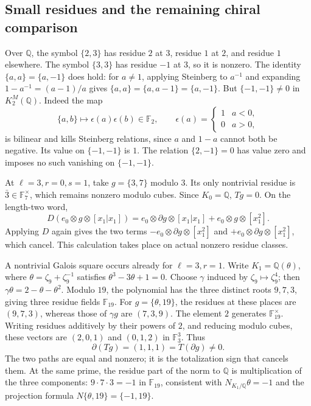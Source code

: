 \subsection{Small residues and the remaining chiral comparison}

Over \(\mathbb Q\), the symbol \(\{2,3\}\) has residue \(2\) at
\(3\), residue \(1\) at \(2\), and residue \(1\) elsewhere.
The symbol \(\{3,3\}\) has residue \(-1\) at \(3\), so it is
nonzero. The identity \(\{a,a\}=\{a,-1\}\) does hold: for
\(a\neq1\), applying Steinberg to \(a^{-1}\) and expanding
\(1-a^{-1}=(a-1)/a\) gives
\(\{a,a\}=\{a,a-1\}=\{a,-1\}\).
But \(\{-1,-1\}\neq0\) in \(K_2^M(\mathbb Q)\). Indeed the map
\[
 \{a,b\}\longmapsto\epsilon(a)\epsilon(b)\in\mathbb F_2,
 \qquad\epsilon(a)=\begin{cases}1&a<0,\\0&a>0,\end{cases}
\]
is bilinear and kills Steinberg relations, since \(a\) and \(1-a\)
cannot both be negative. Its value on \(\{-1,-1\}\) is \(1\).
The relation \(\{2,-1\}=0\) has value zero and imposes no such
vanishing on \(\{-1,-1\}\).

At \(\ell=3,r=0,s=1\), take \(g=\{3,7\}\) modulo \(3\).
Its only nontrivial residue is \(\bar3\in\mathbb F_7^\times\),
which remains nonzero modulo cubes. Since \(K_0=\mathbb Q\),
\(Tg=0\). On the length-two word,
\[
 D(e_0\otimes g\otimes[x_1|x_1])
 =e_0\otimes\partial g\otimes[x_1|x_1]
  +e_0\otimes g\otimes[x_1^2].
\]
Applying \(D\) again gives the two terms
\(-e_0\otimes\partial g\otimes[x_1^2]\) and
\(+e_0\otimes\partial g\otimes[x_1^2]\), which cancel.
This calculation takes place on actual nonzero residue classes.

A nontrivial Galois square occurs already for \(\ell=3,r=1\).
Write \(K_1=\mathbb Q(\theta)\), where
\(\theta=\zeta_9+\zeta_9^{-1}\) satisfies
\(\theta^3-3\theta+1=0\). Choose \(\gamma\) induced by
\(\zeta_9\mapsto\zeta_9^4\); then
\(\gamma\theta=2-\theta-\theta^2\).
Modulo \(19\), the polynomial has the three distinct roots
\(9,7,3\), giving three residue fields \(\mathbb F_{19}\).
For \(g=\{\theta,19\}\), the residues at these places are
\((9,7,3)\), whereas those of \(\gamma g\) are \((7,3,9)\).
The element \(2\) generates \(\mathbb F_{19}^\times\). Writing
residues additively by their powers of \(2\), and reducing modulo
cubes, these vectors are \((2,0,1)\) and \((0,1,2)\) in
\(\mathbb F_3^3\). Thus
\[
 \partial(Tg)=(1,1,1)=T(\partial g)\neq0.
\]
The two paths are equal and nonzero; it is the totalization sign
that cancels them. At the same prime, the residue part of the
norm to \(\mathbb Q\) is multiplication of the three components:
\(9\cdot7\cdot3=-1\) in \(\mathbb F_{19}\), consistent with
\(N_{K_1/\mathbb Q}\theta=-1\) and the projection formula
\(N\{\theta,19\}=\{-1,19\}\).

